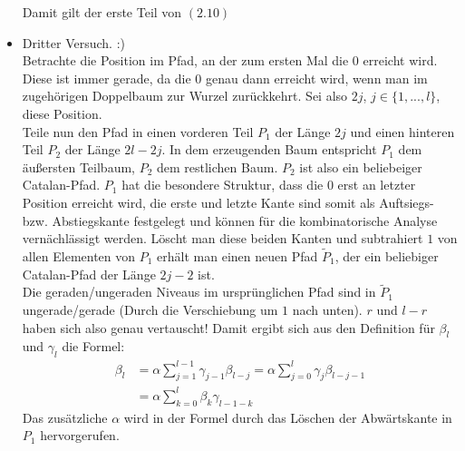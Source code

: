 \documentclass[a4paper, 11pt]{scrreprt}
\begin{document}
\begin{itemize}
Damit gilt der erste Teil von \((2.10)\)\\
\item Dritter Versuch. :)\\
Betrachte die Position im Pfad, an der zum ersten Mal die \(0\) erreicht wird. Diese ist immer gerade, da die \(0\) genau dann erreicht wird, wenn man im zugehörigen Doppelbaum zur Wurzel zurückkehrt. Sei also \(2j\), \(j\in\{1,...,l\}\), diese Position. \\
Teile nun den Pfad in einen vorderen Teil \(P_1\) der Länge \(2j\) und einen hinteren Teil \(P_2\) der Länge \(2l-2j\). In dem erzeugenden Baum entspricht \(P_1\) dem äußersten Teilbaum, \(P_2\) dem restlichen Baum. \(P_2\) ist also ein beliebeiger Catalan-Pfad. \(P_1\) hat die besondere Struktur, dass die \(0\) erst an letzter Position erreicht wird, die erste und letzte Kante sind somit als Auftsiegs- bzw. Abstiegskante festgelegt und können für die kombinatorische Analyse vernächlässigt werden. Löscht man diese beiden Kanten und subtrahiert \(1\) von allen Elementen von \(P_1\) erhält man einen neuen Pfad \(\tilde{P}_1\), der ein beliebiger Catalan-Pfad der Länge \(2j-2\) ist.\\
Die geraden/ungeraden Niveaus im ursprünglichen Pfad sind in \(\tilde{P}_1\) ungerade/gerade (Durch die Verschiebung um \(1\) nach unten). \(r\) und \(l-r\) haben sich also genau vertauscht!
Damit ergibt sich aus den Definition für \(\beta_l\) und \(\gamma_l\) die Formel:
\begin{equation}
	\begin{split}
		\beta_l &= \alpha\sum_{j=1}^{l-1}\gamma_{j-1}\beta_{l-j} = \alpha\sum_{j=0}^l \gamma_j\beta_{l-j-1}\\
		&=\alpha\sum_{k=0}^l \beta_k\gamma_{l-1-k}
	\end{split}
\end{equation}
Das zusätzliche \(\alpha\) wird in der Formel durch das Löschen der Abwärtskante in \(P_1\) hervorgerufen.

\end{itemize}
\end{document}
